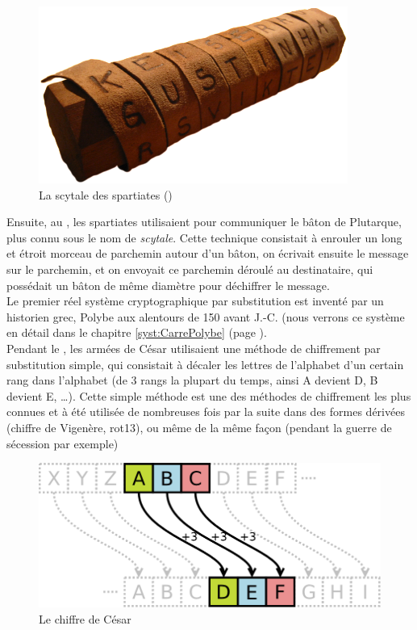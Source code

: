 \begin{figure}[h]
  \begin{center}
    \includegraphics[scale=1]{images/Scytale.png}
  \end{center}
  \caption{La scytale des spartiates ()}
  \label{fig:Scytale}
\end{figure}
  
Ensuite, au , les spartiates utilisaient pour communiquer le
bâton de Plutarque, plus connu sous le nom de \emph{scytale}. Cette
technique consistait à enrouler un long et étroit morceau de parchemin
autour d'un bâton, on écrivait ensuite le message sur le parchemin, et
on envoyait ce parchemin déroulé au destinataire, qui possédait un
bâton
de même diamètre pour déchiffrer le message. \\

Le premier réel système cryptographique par substitution est inventé
par un historien grec, Polybe aux alentours de 150 avant J.-C. (nous
verrons ce système en détail dans le chapitre \ref{syst:CarrePolybe} (page
\pageref{syst:CarrePolybe}). \\

\label{syst:ChiffreCesar}
Pendant le , les armées de César utilisaient une méthode de
chiffrement par substitution simple, qui consistait à décaler les
lettres de l'alphabet d'un certain rang dans l'alphabet (de 3 rangs la
plupart du temps, ainsi A devient D, B devient E, \dots). Cette simple
méthode est une des méthodes de chiffrement les plus connues et à été
utilisée de nombreuses fois par la suite dans des formes dérivées (chiffre de
Vigenère, rot13), ou même
de la même façon (pendant la guerre de sécession par exemple)

\begin{figure}[h]
  \begin{center}
    \includegraphics[scale=0.4]{images/ChiffreCesar.png}
  \end{center}
  \caption{Le chiffre de César}
  \label{fig:ChiffreCesar}
\end{figure}

